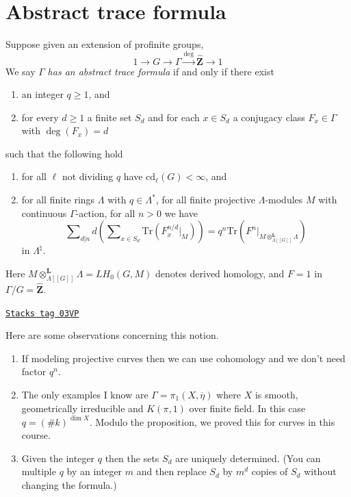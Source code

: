 \section{Abstract trace formula}
\label{trace-section-abstract-trace-formula}
Suppose given an extension of profinite groups,
$$
1 \to G \to \Gamma \xrightarrow{\deg} \widehat{\mathbf{Z}} \to 1
$$
We say $\Gamma$ {\it has an abstract trace formula} if and only if
there exist
\begin{enumerate}
\item an integer $q\geq 1$, and
\item for every $d\geq 1$ a finite set $S_d$ and for each $x\in S_d$ a
conjugacy class $F_x \in \Gamma$ with $\deg(F_x) = d$
\end{enumerate}
such that the following hold
\begin{enumerate}
\item for all $\ell$ not dividing $q$ have $\text{cd}_\ell(G)<\infty$, and
\item for all finite rings $\Lambda$ with $q\in \Lambda^*$,
for all finite projective $\Lambda$-modules $M$ with continuous
$\Gamma$-action, for all $n > 0$ we have
$$
\sum\nolimits_{d|n}d \left(
\sum\nolimits_{x \in S_d}
\text{Tr}( F_x^{n/d} |_M)
\right)
=
q^n \text{Tr}(F^n|_{M \otimes_{\Lambda[[G]]}^{\mathbf{L}}\Lambda})
$$
in $\Lambda^\natural$.
\end{enumerate}
Here $M \otimes_{\Lambda[[G]]}^{\mathbf{L}}\Lambda = LH_0(G, M)$ denotes
derived homology, and $F=1$ in $\Gamma/G = \widehat{\mathbf{Z}}$.

\begin{remark}
\label{trace-remark-abstract-trace-formula}
\href{https://stacks.math.columbia.edu/tag/03VP}{\texttt{Stacks tag 03VP}}

Here are some observations concerning this notion.
\begin{enumerate}
\item If modeling projective curves then we can use cohomology and we
don't need factor $q^n$.
\item The only examples I know are $\Gamma = \pi_1(X, \overline \eta)$
where $X$ is smooth, geometrically irreducible and $K(\pi, 1)$ over finite
field. In this case $q = (\# k)^{\dim X}$. Modulo the proposition, we proved
this for curves in this course.
\item Given the integer $q$ then the sets $S_d$ are uniquely
determined. (You can multiple $q$ by an integer $m$ and then replace $S_d$ by
$m^d$ copies of $S_d$ without changing the formula.)
\end{enumerate}
\end{remark}

